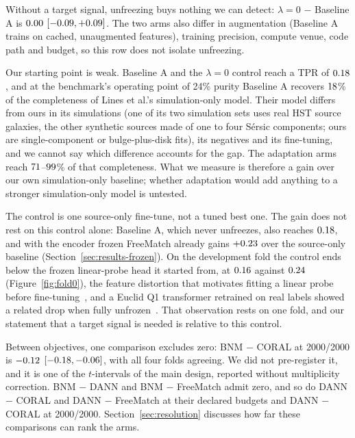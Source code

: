 Without a target signal, unfreezing buys nothing we can detect: $\lambda=0$ $-$ Baseline A is
$0.00{}$ $[-0.09{}, +0.09{}]$. The two arms also differ in augmentation
(Baseline A trains on cached, unaugmented features), training precision, compute venue, code
path and budget, so this row does not isolate unfreezing.

Our starting point is weak. Baseline A and the $\lambda=0$ control reach a TPR of
$0.18{}$, and at the benchmark's operating point of 24\% purity Baseline A recovers
$18{}$\% of the completeness of Lines et al.'s simulation-only model. Their model
differs from ours in its simulations (one of its two simulation sets uses real HST source
galaxies, the other synthetic sources made of one to four S\'ersic components; ours are single-component or
bulge-plus-disk fits), its
negatives and its fine-tuning, and we cannot say which difference accounts for the gap. The
adaptation arms reach $71{}$--$99{}$\% of that completeness. What we measure is
therefore a gain over our own simulation-only baseline; whether adaptation would add anything
to a stronger simulation-only model is untested.

The control is one source-only fine-tune, not a tuned best one. The gain does not rest on this
control alone: Baseline A, which never unfreezes, also reaches $0.18{}$, and with the
encoder frozen FreeMatch already gains $+0.23{}$ over the source-only baseline
(Section~\ref{sec:results-frozen}). On the development fold the control ends
below the frozen linear-probe head it started from, at $0.16{}$ against $0.24{}$
(Figure~\ref{fig:fold0}), the feature distortion that motivates fitting a linear probe before
fine-tuning~\citep{kumar2022lpft}, and a Euclid Q1 transformer retrained on real labels showed a
related drop when fully unfrozen~\citep{astrovink}. That observation rests on one fold, and our statement that
a target signal is needed is relative to this control.

Between objectives, one comparison excludes zero: BNM $-$ CORAL at 2000/2000 is
$-0.12{}$ $[-0.18{}, -0.06{}]$, with all four folds agreeing. We did
not pre-register it, and it is one of the \contrastCount{} $t$-intervals of the main design, reported
without multiplicity correction. BNM $-$ DANN and BNM $-$
FreeMatch admit zero, and so do DANN $-$ CORAL and DANN $-$ FreeMatch at their declared budgets
and DANN $-$ CORAL at 2000/2000. Section~\ref{sec:resolution} discusses how far these
comparisons can rank the arms.

